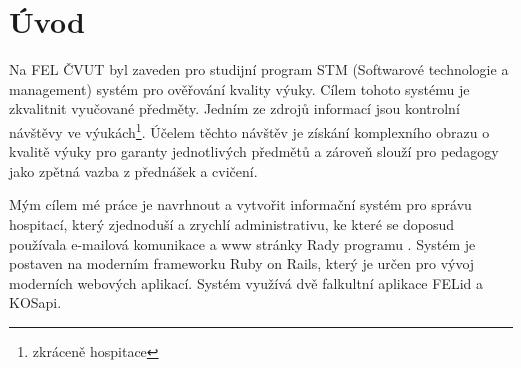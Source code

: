 \chapter{Úvod}

Na FEL ČVUT byl zaveden pro studijní program STM (Softwarové technologie a management) systém pro ověřování kvality výuky. Cílem tohoto systému je zkvalitnit vyučované předměty. Jedním ze zdrojů informací jsou kontrolní návštěvy ve výukách\footnote{zkráceně hospitace}. Účelem těchto návštěv je získání komplexního obrazu o kvalitě výuky pro garanty jednotlivých předmětů a zároveň slouží pro pedagogy jako zpětná vazba z přednášek a cvičení.

Mým cílem mé práce je navrhnout a vytvořit informační systém pro správu hospitací, který zjednoduší a zrychlí administrativu, ke které se doposud používala e-mailová komunikace a www stránky Rady programu \cite{kvalitavyukyweb}. Systém je postaven na moderním frameworku Ruby on Rails, který je určen pro vývoj moderních webových aplikací. Systém využívá dvě falkultní aplikace FELid a KOSapi.
